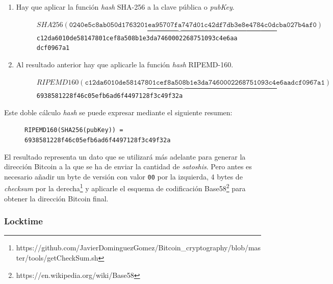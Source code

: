 \documentclass{article}
\begin{document}
    \begin{enumerate}
        \item Hay que aplicar la función \textit{hash} SHA-256 a la clave pública o \textit{pubKey}.
        \begin{figure}[H]
        \centering
            \scriptsize{$\underbrace{SHA256(\texttt{0240e5c8ab050d1763201ea95707fa747d01c42df7db3e8e4784c0dcba027b4af0})}$ \\
            \texttt{c12da6010de58147801cef8a508b1e3da7460002268751093c4e6aadcf0967a1}}
        \end{figure}
        
        \item Al resultado anterior hay que aplicarle la función \textit{hash} RIPEMD-160.
        \begin{figure}[H]
        \centering
            \scriptsize{$\underbrace{RIPEMD160(\texttt{c12da6010de58147801cef8a508b1e3da7460002268751093c4e6aadcf0967a1})}$ \\
            \texttt{6938581228f46c05efb6ad6f4497128f3c49f32a}}
        \end{figure}
    \end{enumerate}
    
    Este doble cálculo \textit{hash} se puede expresar mediante el siguiente resumen:
    
    \begin{figure}[H]
    \centering
        \scriptsize{\texttt{RIPEMD160(SHA256(pubKey)) = 6938581228f46c05efb6ad6f4497128f3c49f32a}}
    \end{figure}
    
    
    El resultado representa un dato que se utilizará más adelante para generar la dirección Bitcoin a la que se ha de enviar la cantidad de \textit{satoshis}. Pero antes es necesario añadir un byte de versión con valor \texttt{00} por la izquierda, 4 bytes de \textit{checksum} por la derecha\footnote{https://github.com/JavierDominguezGomez/Bitcoin\_cryptography/blob/master/tools/getCheckSum.sh} y aplicarle el esquema de codificación Base58\footnote{https://en.wikipedia.org/wiki/Base58} para obtener la dirección Bitcoin final.
    
    \subsubsection{Locktime}
    
\end{document}

